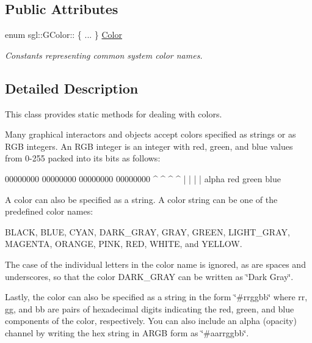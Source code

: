 \subsection*{Public Attributes}
\begin{DoxyCompactItemize}
\item 
enum sgl\+::\+G\+Color\+:: \{ ... \}  \mbox{\hyperlink{classsgl_1_1GColor_ade7509ad941851393fbb7394bc048f82}{Color}}
\begin{DoxyCompactList}\small\item\em Constants representing common system color names. \end{DoxyCompactList}\end{DoxyCompactItemize}


\subsection{Detailed Description}
This class provides static methods for dealing with colors. 

Many graphical interactors and objects accept colors specified as strings or as R\+GB integers. An R\+GB integer is an integer with red, green, and blue values from 0-\/255 packed into its bits as follows\+:


\begin{DoxyPre}
00000000 00000000 00000000 00000000
   ^        ^        ^        ^
   |        |        |        |
 alpha     red     green     blue
\end{DoxyPre}


A color can also be specified as a string. A color string can be one of the predefined color names\+:

{\ttfamily B\+L\+A\+CK}, {\ttfamily B\+L\+UE}, {\ttfamily C\+Y\+AN}, {\ttfamily D\+A\+R\+K\+\_\+\+G\+R\+AY}, {\ttfamily G\+R\+AY}, {\ttfamily G\+R\+E\+EN}, {\ttfamily L\+I\+G\+H\+T\+\_\+\+G\+R\+AY}, {\ttfamily M\+A\+G\+E\+N\+TA}, {\ttfamily O\+R\+A\+N\+GE}, {\ttfamily P\+I\+NK}, {\ttfamily R\+ED}, {\ttfamily W\+H\+I\+TE}, and {\ttfamily Y\+E\+L\+L\+OW}.

The case of the individual letters in the color name is ignored, as are spaces and underscores, so that the color {\ttfamily D\+A\+R\+K\+\_\+\+G\+R\+AY} can be written as {\ttfamily \char`\"{}\+Dark Gray\char`\"{}}.

Lastly, the color can also be specified as a string in the form {\ttfamily \char`\"{}\#rrggbb\char`\"{}} where {\ttfamily rr}, {\ttfamily gg}, and {\ttfamily bb} are pairs of hexadecimal digits indicating the red, green, and blue components of the color, respectively. You can also include an alpha (opacity) channel by writing the hex string in A\+R\+GB form as {\ttfamily \char`\"{}\#aarrggbb\char`\"{}}. 

